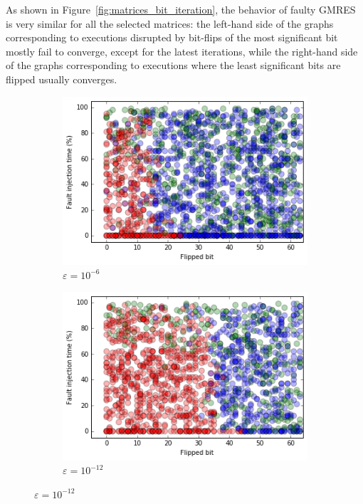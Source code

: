 As shown in Figure~\ref{fig:matrices_bit_iteration}, the behavior of faulty GMRES is very similar for all the selected matrices: the left-hand side of the graphs corresponding to executions disrupted by bit-flips of the most significant bit mostly fail to converge, except for the latest iterations, while the right-hand side of the graphs corresponding to executions where the least significant bits are flipped usually converges. %




\begin{figure}[ht] 
\hspace{3ex}


  \begin{subfigure}[b]{0.5\linewidth}
    \centering
	\includegraphics[width=\linewidth]{figures/bit_iteration_0.png} %
	\caption{$\varepsilon = 10^{-6}$}
    \label{fig:bit_iteration_0}	
  \end{subfigure}%
   \hspace{4ex}
  \begin{subfigure}[b]{0.5\linewidth}
    \centering
    \includegraphics[width=\linewidth]{figures/bit_iteration_1.png} %
	\caption{$\varepsilon = 10^{-12}$}
    \label{fig:bit_iteration_1}	
  \end{subfigure} 


\end{figure}
